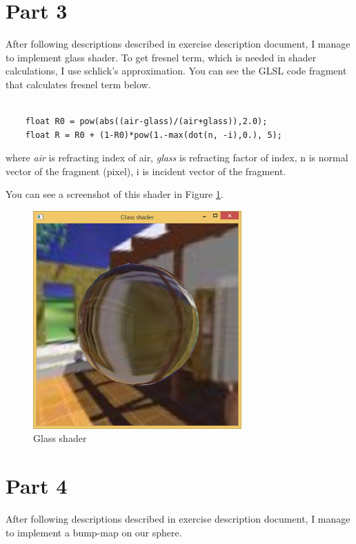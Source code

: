 \section{Part 3}
\label{sec:del-3}

After following descriptions described in exercise description document, I manage to implement glass shader. To get fresnel term, which is needed in shader calculations, I use schlick's approximation. You can see the GLSL code fragment that calculates fresnel term below.
\begin{lstlisting}

	float R0 = pow(abs((air-glass)/(air+glass)),2.0);
	float R = R0 + (1-R0)*pow(1.-max(dot(n, -i),0.), 5);

\end{lstlisting}

\noindent
where \emph{air} is refracting index of air, \emph{glass} is refracting factor of index, n is normal vector of the fragment (pixel), i is incident vector of the fragment.

You can see a screenshot of this shader in Figure \ref{fig:10-3}.

\begin{figure}[hp]
\centering
\includegraphics[width=8cm]{../Screenshots/ex-10/3.png}
\caption{Glass shader}
\label{fig:10-3}
\end{figure}


\section{Part 4}
\label{sec:del-4}


After following descriptions described in exercise description document, I manage to implement a bump-map on our sphere. 

